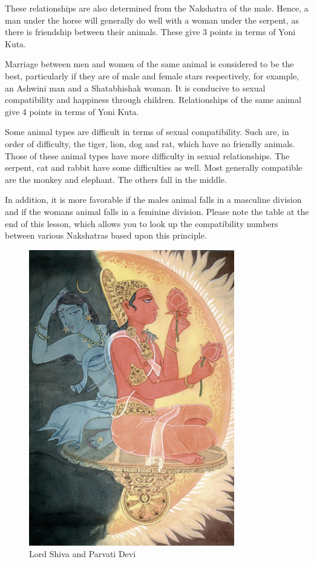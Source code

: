 These relationships are also determined from the Nakshatra of the male. Hence, a man under the horse will generally do well with a woman under the serpent, as there is friendship between their animals. These give 3 points in terms of Yoni Kuta.

 


 

Marriage between men and women of the same animal is considered to be the best, particularly if they are of male and female stars respectively, for example, an Ashwini man and a Shatabhishak woman. It is conducive to sexual compatibility and happiness through children. Relationships of the same animal give 4 points in terms of Yoni Kuta.

 

Some animal types are difficult in terms of sexual compatibility. Such are, in order of difficulty, the tiger, lion, dog and rat, which have no friendly animals. Those of these animal types have more difficulty in sexual relationships. The serpent, cat and rabbit have some difficulties as well. Most generally compatible are the monkey and elephant. The others fall in the middle.

 

In addition, it is more favorable if the males animal falls in a masculine division and if the womans animal falls in a feminine division. Please note the table at the end of this lesson, which allows you to look up the compatibility numbers between various Nakshatras based upon this principle.

 
\begin{figure}[H]
 \centering
\includegraphics[width=0.8\textwidth]{pics/relationship2.png}
\caption{Lord Shiva and Parvati Devi}
 \end{figure}




